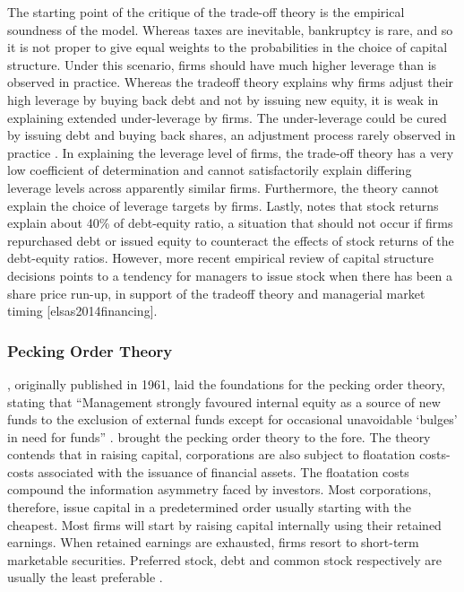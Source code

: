 \documentclass[a4paper, nobind]{templates/ociamthesis}
\begin{document}
The starting point of the critique of the trade-off theory is the empirical soundness of the model. Whereas taxes are inevitable, bankruptcy is rare, and so it is not proper to give equal weights to the probabilities in the choice of capital structure. Under this scenario, firms should have much higher leverage than is observed in practice. Whereas the tradeoff theory explains why firms adjust their high leverage by buying back debt and not by issuing new equity, it is weak in explaining extended under-leverage by firms. The under-leverage could be cured by issuing debt and buying back shares, an adjustment process rarely observed in practice \autocite{myers1984capital}.
In explaining the leverage level of firms, the trade-off theory has a very low coefficient of determination and cannot satisfactorily explain differing leverage levels across apparently similar firms. Furthermore, the theory cannot explain the choice of leverage targets by firms. Lastly, \textcite{welch2004capital} notes that stock returns explain about 40\% of debt-equity ratio, a situation that should not occur if firms repurchased debt or issued equity to counteract the effects of stock returns of the debt-equity ratios. However, more recent empirical review of capital structure decisions points to a tendency for managers to issue stock when there has been a share price run-up, in support of the tradeoff theory and managerial market timing {[}elsas2014financing{]}.

\hypertarget{pecking-order-theory}{%
\subsubsection{Pecking Order Theory}\label{pecking-order-theory}}

\noindent \textcite{donaldson2000corporate}, originally published in 1961, laid the foundations for the pecking order theory, stating that ``Management strongly favoured internal equity as a source of new funds to the exclusion of external funds except for occasional unavoidable `bulges' in need for funds'' \autocite{myers1984capital}. \textcite{myers1984corporate} brought the pecking order theory to the fore. The theory contends that in raising capital, corporations are also subject to floatation costs- costs associated with the issuance of financial assets. The floatation costs compound the information asymmetry faced by investors. Most corporations, therefore, issue capital in a predetermined order usually starting with the cheapest. Most firms will start by raising capital internally using their retained earnings. When retained earnings are exhausted, firms resort to short-term marketable securities. Preferred stock, debt and common stock respectively are usually the least preferable \autocite{chirinko2000testing,fama2002testing}.
\end{document}
